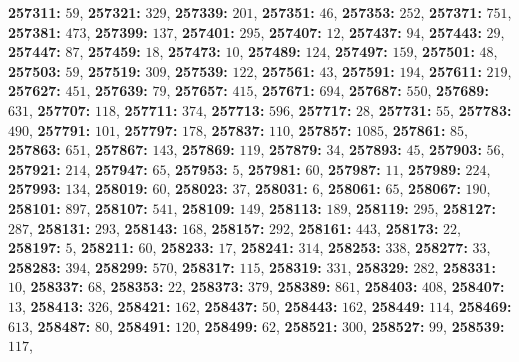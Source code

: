 \textsf{\bfseries 257311:} $59$, \textsf{\bfseries 257321:} $329$, \textsf{\bfseries 257339:} $201$, \textsf{\bfseries 257351:} $46$, \textsf{\bfseries 257353:} $252$, \textsf{\bfseries 257371:} $751$, \textsf{\bfseries 257381:} $473$, \textsf{\bfseries 257399:} $137$, \textsf{\bfseries 257401:} $295$, \textsf{\bfseries 257407:} $12$, \textsf{\bfseries 257437:} $94$, \textsf{\bfseries 257443:} $29$, \textsf{\bfseries 257447:} $87$, \textsf{\bfseries 257459:} $18$, \textsf{\bfseries 257473:} $10$, \textsf{\bfseries 257489:} $124$, \textsf{\bfseries 257497:} $159$, \textsf{\bfseries 257501:} $48$, \textsf{\bfseries 257503:} $59$, \textsf{\bfseries 257519:} $309$, \textsf{\bfseries 257539:} $122$, \textsf{\bfseries 257561:} $43$, \textsf{\bfseries 257591:} $194$, \textsf{\bfseries 257611:} $219$, \textsf{\bfseries 257627:} $451$, \textsf{\bfseries 257639:} $79$, \textsf{\bfseries 257657:} $415$, \textsf{\bfseries 257671:} $694$, \textsf{\bfseries 257687:} $550$, \textsf{\bfseries 257689:} $631$, \textsf{\bfseries 257707:} $118$, \textsf{\bfseries 257711:} $374$, \textsf{\bfseries 257713:} $596$, \textsf{\bfseries 257717:} $28$, \textsf{\bfseries 257731:} $55$, \textsf{\bfseries 257783:} $490$, \textsf{\bfseries 257791:} $101$, \textsf{\bfseries 257797:} $178$, \textsf{\bfseries 257837:} $110$, \textsf{\bfseries 257857:} $1085$, \textsf{\bfseries 257861:} $85$, \textsf{\bfseries 257863:} $651$, \textsf{\bfseries 257867:} $143$, \textsf{\bfseries 257869:} $119$, \textsf{\bfseries 257879:} $34$, \textsf{\bfseries 257893:} $45$, \textsf{\bfseries 257903:} $56$, \textsf{\bfseries 257921:} $214$, \textsf{\bfseries 257947:} $65$, \textsf{\bfseries 257953:} $5$, \textsf{\bfseries 257981:} $60$, \textsf{\bfseries 257987:} $11$, \textsf{\bfseries 257989:} $224$, \textsf{\bfseries 257993:} $134$, \textsf{\bfseries 258019:} $60$, \textsf{\bfseries 258023:} $37$, \textsf{\bfseries 258031:} $6$, \textsf{\bfseries 258061:} $65$, \textsf{\bfseries 258067:} $190$, \textsf{\bfseries 258101:} $897$, \textsf{\bfseries 258107:} $541$, \textsf{\bfseries 258109:} $149$, \textsf{\bfseries 258113:} $189$, \textsf{\bfseries 258119:} $295$, \textsf{\bfseries 258127:} $287$, \textsf{\bfseries 258131:} $293$, \textsf{\bfseries 258143:} $168$, \textsf{\bfseries 258157:} $292$, \textsf{\bfseries 258161:} $443$, \textsf{\bfseries 258173:} $22$, \textsf{\bfseries 258197:} $5$, \textsf{\bfseries 258211:} $60$, \textsf{\bfseries 258233:} $17$, \textsf{\bfseries 258241:} $314$, \textsf{\bfseries 258253:} $338$, \textsf{\bfseries 258277:} $33$, \textsf{\bfseries 258283:} $394$, \textsf{\bfseries 258299:} $570$, \textsf{\bfseries 258317:} $115$, \textsf{\bfseries 258319:} $331$, \textsf{\bfseries 258329:} $282$, \textsf{\bfseries 258331:} $10$, \textsf{\bfseries 258337:} $68$, \textsf{\bfseries 258353:} $22$, \textsf{\bfseries 258373:} $379$, \textsf{\bfseries 258389:} $861$, \textsf{\bfseries 258403:} $408$, \textsf{\bfseries 258407:} $13$, \textsf{\bfseries 258413:} $326$, \textsf{\bfseries 258421:} $162$, \textsf{\bfseries 258437:} $50$, \textsf{\bfseries 258443:} $162$, \textsf{\bfseries 258449:} $114$, \textsf{\bfseries 258469:} $613$, \textsf{\bfseries 258487:} $80$, \textsf{\bfseries 258491:} $120$, \textsf{\bfseries 258499:} $62$, \textsf{\bfseries 258521:} $300$, \textsf{\bfseries 258527:} $99$, \textsf{\bfseries 258539:} $117$, 
